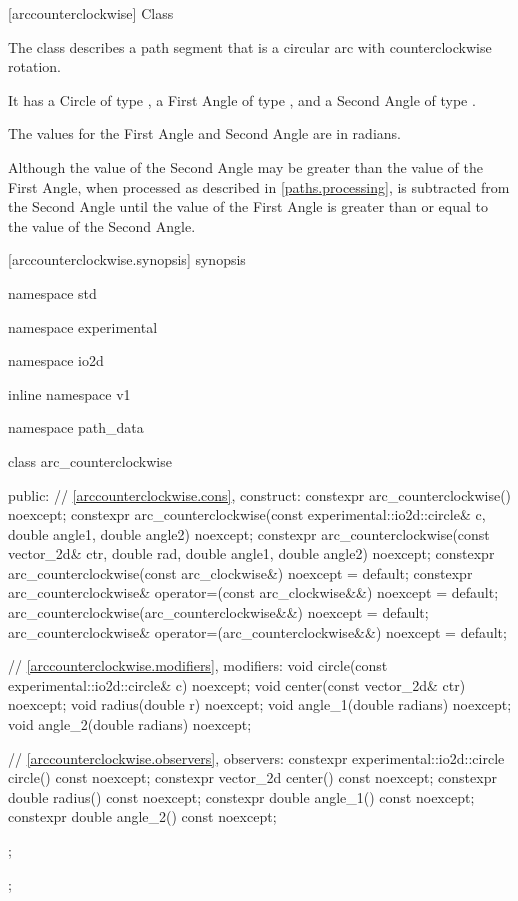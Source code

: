  [arccounterclockwise] {Class }

\pnum
{}
The class  describes a path segment that is a circular arc with counterclockwise rotation.

\pnum
It has a Circle of type , a First Angle of type , and a Second Angle of type .

\pnum
The values for the First Angle and Second Angle are in radians.

\pnum
\enternote
Although the value of the Second Angle may be greater than the value of the First Angle, when processed as described in \ref{paths.processing},  is subtracted from the Second Angle until the value of the First Angle is greater than or equal to the value of the Second Angle.
\exitnote

 [arccounterclockwise.synopsis] { synopsis}

\begin{codeblock}
namespace std { namespace experimental { namespace io2d { inline namespace v1 {
  namespace path_data {
    class arc_counterclockwise {
    public:
      // \ref{arccounterclockwise.cons}, construct:
      constexpr arc_counterclockwise() noexcept;
      constexpr arc_counterclockwise(const experimental::io2d::circle& c,
        double angle1, double angle2) noexcept;
      constexpr arc_counterclockwise(const vector_2d& ctr, double rad,
        double angle1, double angle2) noexcept;
      constexpr arc_counterclockwise(const arc_clockwise&) noexcept = default;
      constexpr arc_counterclockwise& operator=(const arc_clockwise&&)
        noexcept = default;
      arc_counterclockwise(arc_counterclockwise&&) noexcept = default;
      arc_counterclockwise& operator=(arc_counterclockwise&&)
        noexcept = default;

      // \ref{arccounterclockwise.modifiers}, modifiers:
      void circle(const experimental::io2d::circle& c) noexcept;
      void center(const vector_2d& ctr) noexcept;
      void radius(double r) noexcept;
      void angle_1(double radians) noexcept;
      void angle_2(double radians) noexcept;

      // \ref{arccounterclockwise.observers}, observers:
      constexpr experimental::io2d::circle circle() const noexcept;
      constexpr vector_2d center() const noexcept;
      constexpr double radius() const noexcept;
      constexpr double angle_1() const noexcept;
      constexpr double angle_2() const noexcept;
    };
  };
} } } }
\end{codeblock}

